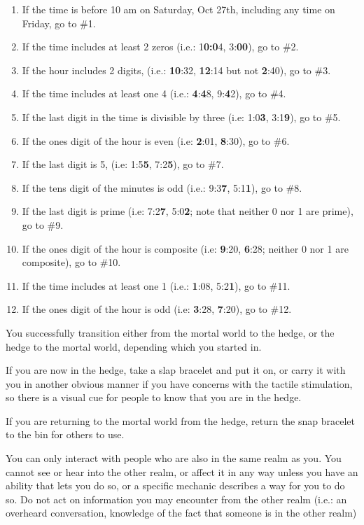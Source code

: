 \documentclass[green]{gl2018}
\begin{document}
\begin{enumerate}
\item If the time is before 10 am on Saturday, Oct 27th, including any time on Friday, go to \#1.
\item 
If the time includes at least 2 zeros (i.e.: 1\textbf{0:0}4, 3:\textbf{00}), go to \#2.
\item If the hour includes 2 digits, (i.e.: \textbf{10}:32, \textbf{12}:14 but not \textbf{2}:40), go to \#3.
\item 
If the time includes at least one 4 (i.e.: \textbf{4}:\textbf{4}8, 9:\textbf{4}2), go to \#4.
\item 
If the last digit in the time is divisible by three (i.e: 1:0\textbf{3}, 3:1\textbf{9}), go to \#5.
\item
If the ones digit of the hour is even (i.e: \textbf{2}:01, \textbf{8}:30), go to \#6.
\item
If the last digit is 5, (i.e: 1:5\textbf{5}, 7:2\textbf{5}), go to \#7. 
\item If the tens digit of the minutes is odd (i.e.: 9:3\textbf{7}, 5:1\textbf{1}), go to \#8.
\item
If the last digit is prime (i.e: 7:2\textbf{7}, 5:0\textbf{2}; note that neither 0 nor 1 are prime), go to \#9.
\item If the ones digit of the hour is composite (i.e: \textbf{9}:20, \textbf{6}:28; neither 0 nor 1 are composite), go to \#10.
\item If the time includes at least one 1 (i.e.: {\bf 1}:08, 5:2{\bf 1}), go to \#11.
\item If the ones digit of the hour is odd (i.e: {\bf 3}:28, {\bf 7}:20), go to \#12.
\end{enumerate}
\pagebreak
\begin{sect}{1}
You successfully transition either from the mortal world to the hedge, or the hedge to the mortal world, depending which you started in.

If you are now in the hedge, take a slap bracelet and put it on, or carry it with you in another obvious manner if you have concerns with the tactile stimulation, so there is a visual cue for people to know that you are in the hedge.

If you are returning to the mortal world from the hedge, return the snap bracelet to the bin for others to use.

You can only interact with people who are also in the same realm as you. You cannot see or hear into the other realm, or affect it in any way unless you have an ability that lets you do so, or a specific mechanic describes a way for you to do so. Do not act on information you may encounter from the other realm (i.e.: an overheard conversation, knowledge of the fact that someone is in the other realm)
\end{sect}
\end{document}
